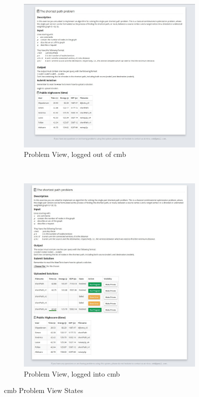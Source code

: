 \begin{figure}
    \centering
    \begin{subfigure}[b]{0.82\textwidth}
        \includegraphics[width=\textwidth]{figs/problem.jpg}
        \caption{Problem View, logged out of \gls{cmb}}
        \label{fig:problem}
    \end{subfigure}
    ~ %
    \begin{subfigure}[b]{0.82\textwidth}
        \includegraphics[width=\textwidth]{figs/problem_loggedin.jpg}
        \caption{Problem View, logged into \gls{cmb}}
        \label{fig:problem-loggedin}
    \end{subfigure}
    \caption{\gls{cmb} Problem View States}\label{fig:problem-view}
\end{figure}

